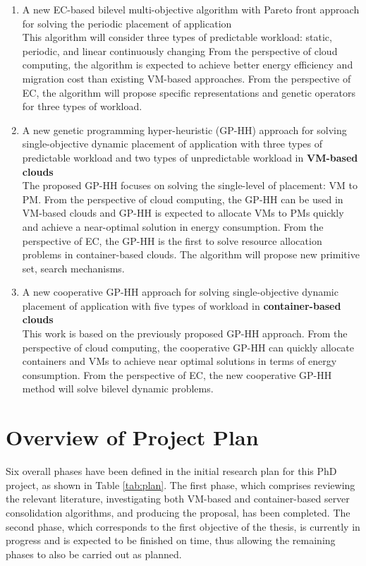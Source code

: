 \begin{enumerate}
	\item A new EC-based bilevel multi-objective algorithm with Pareto front approach for solving the periodic placement of application\\

	This algorithm will consider three types of predictable workload: static, periodic, and linear continuously changing From the perspective of cloud computing, the algorithm is expected to achieve better energy efficiency and migration cost than existing VM-based approaches. From the perspective of EC, the algorithm will propose specific representations and genetic operators for three types of workload. 

	\item A new genetic programming hyper-heuristic (GP-HH) approach for solving single-objective dynamic placement of application with three types of predictable workload and two types of unpredictable workload in \textbf{VM-based clouds} \\

	The proposed GP-HH focuses on solving the single-level of placement: VM to PM. From the perspective of cloud computing,
	the GP-HH can be used in VM-based clouds and GP-HH is expected to allocate VMs to PMs quickly and achieve a near-optimal solution in energy consumption.
	From the perspective of EC,  the GP-HH is the first to solve resource allocation problems in container-based clouds. The algorithm will propose new primitive set, search mechanisms.

	\item A new cooperative GP-HH approach for solving single-objective dynamic placement of application with five types of workload in \textbf{container-based clouds} \\

	This work is based on the previously proposed GP-HH approach.
	From the perspective of cloud computing, the cooperative GP-HH can quickly allocate containers and VMs to achieve near optimal solutions in terms of energy consumption.
	From the perspective of EC, the new cooperative GP-HH method will solve bilevel dynamic problems.
\end{enumerate}

\section{Overview of Project Plan}
Six overall phases have been defined in the initial research plan for this PhD project, as
shown in Table \ref{tab:plan}. The first phase, which comprises reviewing the relevant literature, investigating both VM-based and container-based server consolidation algorithms, and producing the proposal, has
been completed. The second phase, which corresponds to the first objective of the thesis, is
currently in progress and is expected to be finished on time, thus allowing the remaining
phases to also be carried out as planned.


